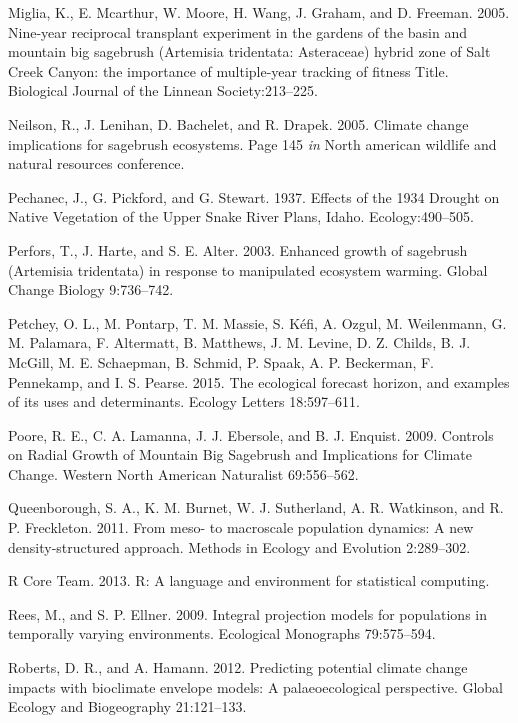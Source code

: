 \documentclass[12pt,]{article}
\begin{document}
\hypertarget{ref-Miglia2005}{}
Miglia, K., E. Mcarthur, W. Moore, H. Wang, J. Graham, and D. Freeman.
2005. Nine-year reciprocal transplant experiment in the gardens of the
basin and mountain big sagebrush (Artemisia tridentata: Asteraceae)
hybrid zone of Salt Creek Canyon: the importance of multiple-year
tracking of fitness Title. Biological Journal of the Linnean
Society:213--225.

\hypertarget{ref-Neilson2005}{}
Neilson, R., J. Lenihan, D. Bachelet, and R. Drapek. 2005. Climate
change implications for sagebrush ecosystems. Page 145 \emph{in} North
american wildlife and natural resources conference.

\hypertarget{ref-Pechanec1937}{}
Pechanec, J., G. Pickford, and G. Stewart. 1937. Effects of the 1934
Drought on Native Vegetation of the Upper Snake River Plans, Idaho.
Ecology:490--505.

\hypertarget{ref-Perfors2003}{}
Perfors, T., J. Harte, and S. E. Alter. 2003. Enhanced growth of
sagebrush (Artemisia tridentata) in response to manipulated ecosystem
warming. Global Change Biology 9:736--742.

\hypertarget{ref-Petchey2015}{}
Petchey, O. L., M. Pontarp, T. M. Massie, S. Kéfi, A. Ozgul, M.
Weilenmann, G. M. Palamara, F. Altermatt, B. Matthews, J. M. Levine, D.
Z. Childs, B. J. McGill, M. E. Schaepman, B. Schmid, P. Spaak, A. P.
Beckerman, F. Pennekamp, and I. S. Pearse. 2015. The ecological forecast
horizon, and examples of its uses and determinants. Ecology Letters
18:597--611.

\hypertarget{ref-Poore2009}{}
Poore, R. E., C. A. Lamanna, J. J. Ebersole, and B. J. Enquist. 2009.
Controls on Radial Growth of Mountain Big Sagebrush and Implications for
Climate Change. Western North American Naturalist 69:556--562.

\hypertarget{ref-Queenborough2011}{}
Queenborough, S. A., K. M. Burnet, W. J. Sutherland, A. R. Watkinson,
and R. P. Freckleton. 2011. From meso- to macroscale population
dynamics: A new density-structured approach. Methods in Ecology and
Evolution 2:289--302.

\hypertarget{ref-R2013}{}
R Core Team. 2013. R: A language and environment for statistical
computing.

\hypertarget{ref-Rees2009}{}
Rees, M., and S. P. Ellner. 2009. Integral projection models for
populations in temporally varying environments. Ecological Monographs
79:575--594.

\hypertarget{ref-Roberts2012}{}
Roberts, D. R., and A. Hamann. 2012. Predicting potential climate change
impacts with bioclimate envelope models: A palaeoecological perspective.
Global Ecology and Biogeography 21:121--133.
\end{document}
